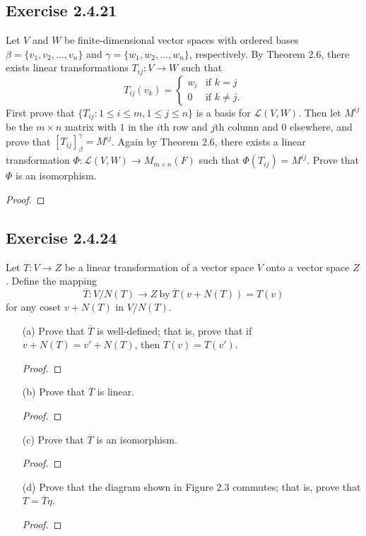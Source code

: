\subsection*{Exercise 2.4.21} Let \( V  \) and \( W  \) be finite-dimensional vector spaces with ordered bases \( \beta = \{ {v}_{1}, {v}_{2}, \dots, {v}_{n} \}  \) and \( \gamma = \{ {w}_{1}, {w}_{2}, \dots, {w}_{n} \}  \), respectively. By Theorem 2.6, there exists linear transformations \( {T}_{ij}: V \to W  \) such that
\[  {T}_{ij}({v}_{k }) = 
\begin{cases}
    {w}_{i} &\text{if } k = j \\
    0 &\text{if } k \neq j. 
\end{cases} \]
First prove that \( \{ {T}_{ij} : 1 \leq i \leq m, 1 \leq j \leq n  \}  \) is a basis for \( \mathcal{L}(V,W)  \). Then let \( M^{ij}  \) be the \( m \times n  \) matrix with \( 1  \) in the \( i \)th row and \( j \)th column and \( 0  \) elsewhere, and prove that \( [{T}_{ij}]_{\beta}^{\gamma}  = M^{ij}  \). Again by Theorem 2.6, there exists a linear transformation \( \Phi: \mathcal{L}(V,W) \to {M}_{m \times n}(F)   \) such that \( \Phi({T}_{ij}) = M^{ij} \). Prove that \( \Phi  \) is an isomorphism.
\begin{proof}

\end{proof}

\subsection*{Exercise 2.4.24} Let \( T: V \to Z  \) be a linear transformation of a vector space \( V  \) onto a vector space \( Z  \). Define the mapping
\[  \overline{T}: V / N(T) \to Z \ \text{by} \ \overline{T}(v + N(T)) = T(v)  \] 
for any coset \( v + N(T)  \) in \( V / N(T) \).
\begin{enumerate}
    \item[(a)] Prove that \( \overline{T} \) is well-defined; that is, prove that if \( v + N(T) = v' + N(T)  \), then \( T(v) = T(v')  \).
        \begin{proof}
        
        \end{proof}
    \item[(b)] Prove that \( \overline{T}  \) is linear.
        \begin{proof}
        
        \end{proof}
    \item[(c)] Prove that \( \overline{T}  \) is an isomorphism.
        \begin{proof}
        
        \end{proof}
    \item[(d)] Prove that the diagram shown in Figure 2.3 commutes; that is, prove that \( T = \overline{T} \eta \).
        \begin{proof}
        
        \end{proof}
\end{enumerate}


